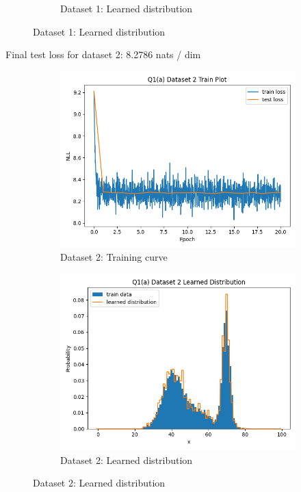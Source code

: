 \documentclass{article}
\begin{document}
\begin{enumerate}[(a)]
\begin{figure}[H]
\begin{subfigure}{0.45\textwidth}
        \caption{Dataset 1: Learned distribution}
    \end{subfigure}
\end{figure}
Final test loss for dataset 2: 8.2786 nats / dim
\begin{figure}[H]
    \centering
    \begin{subfigure}{0.45\textwidth}
        \centering
        \includegraphics[width=\textwidth]{figures/q1_a_dset2_train_plot.png}
        \caption{Dataset 2: Training curve}
    \end{subfigure}
    \hspace{0.2in}
    \begin{subfigure}{0.45\textwidth}
        \centering
        \includegraphics[width=\textwidth]{figures/q1_a_dset2_learned_dist.png}
        \caption{Dataset 2: Learned distribution}
    \end{subfigure}
\end{figure}


\end{enumerate}
\end{document}
